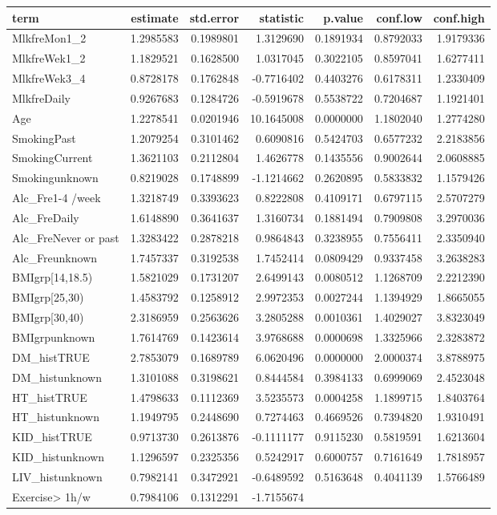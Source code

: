 \documentclass[]{article}
\begin{document}
\begin{longtable}[]{@{}lrrrrrr@{}}
\toprule
term & estimate & std.error & statistic & p.value & conf.low &
conf.high\tabularnewline
\midrule
\endhead
MlkfreMon1\_2 & 1.2985583 & 0.1989801 & 1.3129690 & 0.1891934 &
0.8792033 & 1.9179336\tabularnewline
MlkfreWek1\_2 & 1.1829521 & 0.1628500 & 1.0317045 & 0.3022105 &
0.8597041 & 1.6277411\tabularnewline
MlkfreWek3\_4 & 0.8728178 & 0.1762848 & -0.7716402 & 0.4403276 &
0.6178311 & 1.2330409\tabularnewline
MlkfreDaily & 0.9267683 & 0.1284726 & -0.5919678 & 0.5538722 & 0.7204687
& 1.1921401\tabularnewline
Age & 1.2278541 & 0.0201946 & 10.1645008 & 0.0000000 & 1.1802040 &
1.2774280\tabularnewline
SmokingPast & 1.2079254 & 0.3101462 & 0.6090816 & 0.5424703 & 0.6577232
& 2.2183856\tabularnewline
SmokingCurrent & 1.3621103 & 0.2112804 & 1.4626778 & 0.1435556 &
0.9002644 & 2.0608885\tabularnewline
Smokingunknown & 0.8219028 & 0.1748899 & -1.1214662 & 0.2620895 &
0.5833832 & 1.1579426\tabularnewline
Alc\_Fre1-4 /week & 1.3218749 & 0.3393623 & 0.8222808 & 0.4109171 &
0.6797115 & 2.5707279\tabularnewline
Alc\_FreDaily & 1.6148890 & 0.3641637 & 1.3160734 & 0.1881494 &
0.7909808 & 3.2970036\tabularnewline
Alc\_FreNever or past & 1.3283422 & 0.2878218 & 0.9864843 & 0.3238955 &
0.7556411 & 2.3350940\tabularnewline
Alc\_Freunknown & 1.7457337 & 0.3192538 & 1.7452414 & 0.0809429 &
0.9337458 & 3.2638283\tabularnewline
BMIgrp{[}14,18.5) & 1.5821029 & 0.1731207 & 2.6499143 & 0.0080512 &
1.1268709 & 2.2212390\tabularnewline
BMIgrp{[}25,30) & 1.4583792 & 0.1258912 & 2.9972353 & 0.0027244 &
1.1394929 & 1.8665055\tabularnewline
BMIgrp{[}30,40) & 2.3186959 & 0.2563626 & 3.2805288 & 0.0010361 &
1.4029027 & 3.8323049\tabularnewline
BMIgrpunknown & 1.7614769 & 0.1423614 & 3.9768688 & 0.0000698 &
1.3325966 & 2.3283872\tabularnewline
DM\_histTRUE & 2.7853079 & 0.1689789 & 6.0620496 & 0.0000000 & 2.0000374
& 3.8788975\tabularnewline
DM\_histunknown & 1.3101088 & 0.3198621 & 0.8444584 & 0.3984133 &
0.6999069 & 2.4523048\tabularnewline
HT\_histTRUE & 1.4798633 & 0.1112369 & 3.5235573 & 0.0004258 & 1.1899715
& 1.8403764\tabularnewline
HT\_histunknown & 1.1949795 & 0.2448690 & 0.7274463 & 0.4669526 &
0.7394820 & 1.9310491\tabularnewline
KID\_histTRUE & 0.9713730 & 0.2613876 & -0.1111177 & 0.9115230 &
0.5819591 & 1.6213604\tabularnewline
KID\_histunknown & 1.1296597 & 0.2325356 & 0.5242917 & 0.6000757 &
0.7161649 & 1.7818957\tabularnewline
LIV\_histunknown & 0.7982141 & 0.3472921 & -0.6489592 & 0.5163648 &
0.4041139 & 1.5766489\tabularnewline
Exercise\textgreater{} 1h/w & 0.7984106 & 0.1312291 & -1.7155674 &

\end{longtable}
\end{document}
